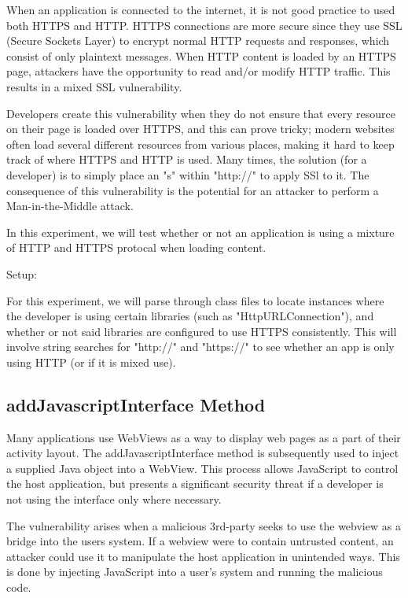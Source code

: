         When an application is connected to the internet, it is not 
        good practice to used both HTTPS and HTTP. HTTPS connections 
        are more secure since they use SSL (Secure Sockets Layer) to 
        encrypt normal HTTP requests and responses, which consist of 
        only plaintext messages. When HTTP content is loaded by an 
        HTTPS page, attackers have the opportunity to read and/or modify
        HTTP traffic. This results in a mixed SSL vulnerability.

        Developers create this vulnerability when they do not ensure 
        that every resource on their page is loaded over HTTPS, and 
        this can prove tricky; modern websites often load several 
        different resources from various places, making it hard to 
        keep track of where HTTPS and HTTP is used. Many times, the 
        solution (for a developer) is to simply place an "s" within 
        "http://" to apply SSl to it. The consequence of this vulnerability 
        is the potential for an attacker to perform a Man-in-the-Middle 
        attack.

        In this experiment, we will test whether or not an application is 
        using a mixture of HTTP and HTTPS protocal when loading content.

        Setup:

        For this experiment, we will parse through class files to locate
        instances where the developer is using certain libraries (such as 
        "HttpURLConnection"), and whether or not said libraries are configured
        to use HTTPS consistently. This will involve string searches for 
        "http://" and "https://" to see whether an app is only using HTTP (or
        if it is mixed use).

    \subsection{addJavascriptInterface Method}

        Many applications use WebViews as a way to display web pages as a 
        part of their activity layout. The addJavascriptInterface method 
        is subsequently used to inject a supplied Java object into a WebView. 
        This process allows JavaScript to control the host application, 
        but presents a significant security threat if a developer is not 
        using the interface only where necessary. 

        The vulnerability arises when a malicious 3rd-party seeks to use 
        the webview as a bridge into the users system. If a webview were to
        contain untrusted content, an attacker could use it to manipulate the
        host application in unintended ways. This is done by injecting JavaScript 
        into a user's system and running the malicious code.
        
